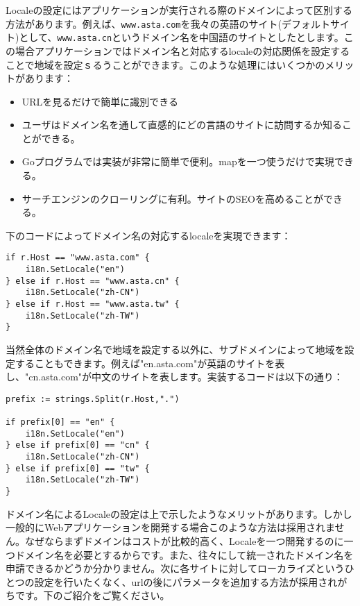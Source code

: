 Localeの設定にはアプリケーションが実行される際のドメインによって区別する方法があります。例えば、\texttt{www.asta.com}を我々の英語のサイト(デフォルトサイト)として、\texttt{www.asta.cn}というドメイン名を中国語のサイトとしたとします。この場合アプリケーションではドメイン名と対応するlocaleの対応関係を設定することで地域を設定ｓるうことができます。このような処理にはいくつかのメリットがあります：

\begin{itemize}
  \item URLを見るだけで簡単に識別できる
  \item ユーザはドメイン名を通して直感的にどの言語のサイトに訪問するか知ることができる。
  \item Goプログラムでは実装が非常に簡単で便利。mapを一つ使うだけで実現できる。
  \item サーチエンジンのクローリングに有利。サイトのSEOを高めることができる。
\end{itemize}

下のコードによってドメイン名の対応するlocaleを実現できます：

\begin{lstlisting}[numbers=none]
if r.Host == "www.asta.com" {
    i18n.SetLocale("en")
} else if r.Host == "www.asta.cn" {
    i18n.SetLocale("zh-CN")
} else if r.Host == "www.asta.tw" {
    i18n.SetLocale("zh-TW")
}
\end{lstlisting}

当然全体のドメイン名で地域を設定する以外に、サブドメインによって地域を設定することもできます。例えば"en.asta.com"が英語のサイトを表し、"cn.asta.com"が中文のサイトを表します。実装するコードは以下の通り：

\begin{lstlisting}[numbers=none]
prefix := strings.Split(r.Host,".")

if prefix[0] == "en" {
    i18n.SetLocale("en")
} else if prefix[0] == "cn" {
    i18n.SetLocale("zh-CN")
} else if prefix[0] == "tw" {
    i18n.SetLocale("zh-TW")
}
\end{lstlisting}

ドメイン名によるLocaleの設定は上で示したようなメリットがあります。しかし一般的にWebアプリケーションを開発する場合このような方法は採用されません。なぜならまずドメインはコストが比較的高く、Localeを一つ開発するのに一つドメイン名を必要とするからです。また、往々にして統一されたドメイン名を申請できるかどうか分かりません。次に各サイトに対してローカライズというひとつの設定を行いたくなく、urlの後にパラメータを追加する方法が採用されがちです。下のご紹介をご覧ください。
